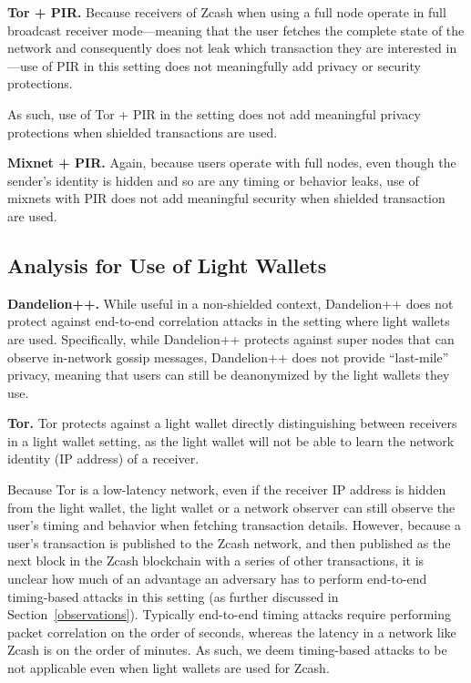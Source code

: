 \documentclass{article}
\begin{document}
\textbf{Tor + PIR.}
Because receivers of Zcash when using a full node operate in full broadcast
receiver mode---meaning that the user fetches the complete state of the network
and consequently does not leak which transaction they are interested in---use
of PIR in this setting does not meaningfully add privacy or security
protections.

As such, use of Tor + PIR in the setting does not add meaningful privacy
protections when shielded transactions are used.

\textbf{Mixnet + PIR.}
Again, because users operate with full nodes, even though the sender's identity
is hidden and so are any timing or behavior leaks, use of mixnets with PIR does
not add meaningful security when shielded transaction are used.

\subsection{Analysis for Use of Light Wallets}

\textbf{Dandelion++.}
While useful in a non-shielded context, Dandelion++ does not protect against
end-to-end correlation attacks in the setting where light wallets are used.
Specifically, while Dandelion++ protects against super nodes that can observe
in-network gossip messages, Dandelion++ does not provide ``last-mile'' privacy,
meaning that users can still be deanonymized by the light wallets they use.

\textbf{Tor.}
Tor protects against a light wallet directly distinguishing between receivers
in a light wallet setting, as the light wallet will not be able to learn the
network identity (IP address) of a receiver.

Because Tor is a low-latency
network, even if the receiver IP address is hidden from the light wallet, the
light wallet or a network observer can still observe the user's timing and
behavior when fetching transaction details. However, because a user's
transaction is published to the Zcash network, and then published as the next
block in the Zcash blockchain with a series of other transactions, it is
unclear how much of an advantage an adversary has to perform end-to-end
timing-based attacks in this setting (as further discussed in
Section~\ref{observations}). Typically end-to-end timing attacks
require performing packet correlation on the order of seconds, whereas the
latency in a network like Zcash is on the order of minutes. As such, we deem
timing-based attacks to be not applicable even when light wallets are used for
Zcash.
\end{document}
